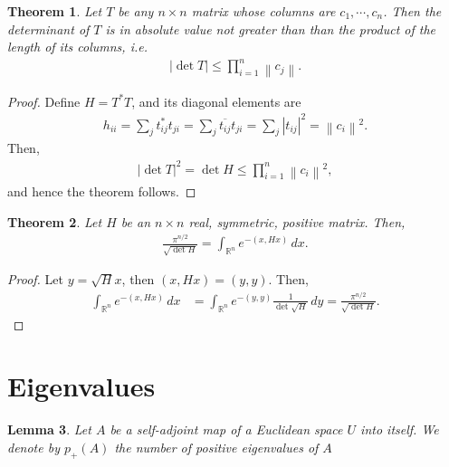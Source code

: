 \documentclass[11pt]{book}
\newtheorem{theorem}{Theorem}[section]
\newtheorem{lemma}[theorem]{Lemma}
\theoremstyle{definition}
\numberwithin{equation}{subsection}
\begin{document}
\medskip

\begin{theorem}
Let $T$ be any $n \times n$ matrix whose columns are $c_1, \cdots, c_n$. Then the determinant of $T$ is in absolute value not greater than than the product of the length of its columns, i.e.
\begin{align*}
    \left|\det T \right| \leq \prod^n_{i=1} \left\|c_j \right\|.
\end{align*}
\end{theorem}
\begin{proof}
Define $H = T^*T$, and its diagonal elements are
\begin{align*}
    h_{ii} = \sum_j t^*_{ij}t_{ji} = \sum_j \overline{t_{ij}} t_{ji} = \sum_j \left|t_{ij}\right|^2 = \left\|c_i \right\|^2.
\end{align*}
Then,
\begin{align*}
    \left|\det T \right|^2 = \det H \leq \prod^n_{i=1} \left\|c_i \right\|^2,
\end{align*}
and hence the theorem follows.
\end{proof}

\medskip

\begin{theorem}
Let $H$ be an $n \times n$ real, symmetric, positive matrix. Then,
\begin{align*}
    \frac{\pi^{n/2}}{\sqrt{\det H}} = \int_{\mathbb{R}^n} e^{-(x,Hx)}\, dx.
\end{align*}
\end{theorem}
\begin{proof}
Let $y = \sqrt{H}x$, then $(x, Hx) = (y, y)$. Then,
\begin{align*}
    \int_{\mathbb{R}^n} e^{-(x,Hx)}\, dx & = \int_{\mathbb{R}^n} e^{-(y,y)} \frac{1}{\det \sqrt{H}} \, dy = \frac{\pi^{n/2}}{\sqrt{\det H}}.
\end{align*}
\end{proof}

\section{Eigenvalues}
\begin{lemma}
Let $A$ be a self-adjoint map of a Euclidean space $U$ into itself. We denote by $p_+(A)$ the number of positive eigenvalues of $A$
\end{lemma}
\end{document}
